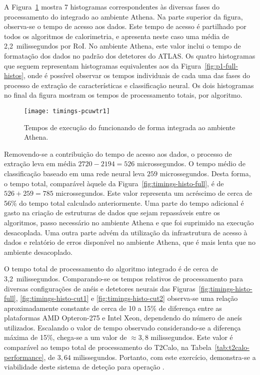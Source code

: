 A Figura~\ref{fig:timings-athena} mostra 7 histogramas correspondentes às
diversas fases do processamento do  integrado ao ambiente
Athena. Na parte superior da figura, observa-se o tempo de acesso aos
dados. Este tempo de acesso é partilhado por todos os algoritmos de
calorimetria, e apresenta neste caso uma média de 2,2~milissegundos por
RoI. No ambiente Athena, este valor inclui o tempo de formatação dos dados no
padrão dos detetores do ATLAS. Os quatro histogramas que seguem representam
histogramas equivalentes aos da Figura~\ref{fig:p1-full-histos}, onde é
possível observar os tempos individuais de cada uma das fases do processo de
extração de características e classificação neural. Os dois histogramas no
final da figura mostram os tempos de processamento totais, por algoritmo.

\begin{figure}
\begin{center}
\texttt{[image: timings-pcuwtr1]}
\end{center}
\caption{Tempos de execução do  funcionando de forma
integrada ao ambiente Athena.}
\label{fig:timings-athena}
\end{figure}

Removendo-se a contribuição do tempo de acesso aos dados, o processo de
extração leva em média $2720-2194=526$ microssegundos. O tempo médio de
classificação baseado em uma rede neural leva $259$ microssegundos. Desta
forma, o tempo total, comparável àquele da
Figura~\ref{fig:timings-histo-full}, é de $526+259=785$ microssegundos. Este
valor representa um acréscimo de cerca de 56\% do tempo total calculado
anteriormente. Uma parte do tempo adicional é gasto na criação de estruturas
de dados que sejam repassáveis entre os algoritmos, passo necessário no
ambiente Athena e que foi suprimido na execução desacoplada. Uma outra parte
advém da utilização da infrastrutura de acesso à dados e relatório de erros
disponível no ambiente Athena, que é mais lenta que no ambiente desacoplado.

O tempo total de processamento do algoritmo integrado é de cerca de
3,2~milissegundos. Comparando-se os tempos relativos de processamento para
diversas configurações de anéis e detetores neurais das
Figuras~\ref{fig:timings-histo-full}, \ref{fig:timings-histo-cut1} e
\ref{fig:timings-histo-cut2} observa-se uma relação aproximadamente constante
de cerca de 10 a 15\% de diferença entre as plataformas AMD Opteron-275 e
Intel Xeon, dependendo do número de aneís utilizados. Escalando o valor de
tempo observado considerando-se a diferença máxima de 15\%, chega-se a um
valor de $\approx 3,8$ milissegundos. Este valor é comparável ao tempo total
de processamento do T2Calo, na Tabela~\ref{tab:t2calo-performance}, de $3,64$
milissegundos. Portanto, com este exercício, demonstra-se a viabilidade deste
sistema de deteção para operação .

